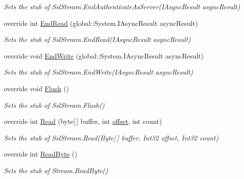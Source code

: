 \begin{DoxyCompactItemize}
\begin{DoxyCompactList}\small\item\em Sets the stub of Ssl\-Stream.\-End\-Authenticate\-As\-Server(\-I\-Async\-Result async\-Result)\end{DoxyCompactList}\item 
override int \hyperlink{class_system_1_1_net_1_1_security_1_1_fakes_1_1_stub_ssl_stream_a9f83d5a46f6e45edff9314a470deec02}{End\-Read} (global\-::\-System.\-I\-Async\-Result async\-Result)
\begin{DoxyCompactList}\small\item\em Sets the stub of Ssl\-Stream.\-End\-Read(\-I\-Async\-Result async\-Result)\end{DoxyCompactList}\item 
override void \hyperlink{class_system_1_1_net_1_1_security_1_1_fakes_1_1_stub_ssl_stream_adfb11a766ace6ed754e8dca373d4768d}{End\-Write} (global\-::\-System.\-I\-Async\-Result async\-Result)
\begin{DoxyCompactList}\small\item\em Sets the stub of Ssl\-Stream.\-End\-Write(\-I\-Async\-Result async\-Result)\end{DoxyCompactList}\item 
override void \hyperlink{class_system_1_1_net_1_1_security_1_1_fakes_1_1_stub_ssl_stream_aebbe398080aa5af7e91b6cb3e2875234}{Flush} ()
\begin{DoxyCompactList}\small\item\em Sets the stub of Ssl\-Stream.\-Flush()\end{DoxyCompactList}\item 
override int \hyperlink{class_system_1_1_net_1_1_security_1_1_fakes_1_1_stub_ssl_stream_acb2d2977c07955e3d76ff6200fb79311}{Read} (byte\mbox{[}$\,$\mbox{]} buffer, int \hyperlink{jquery-1_810_82_8js_a4a9f594d20d927164551fc7fa4751a2f}{offset}, int count)
\begin{DoxyCompactList}\small\item\em Sets the stub of Ssl\-Stream.\-Read(\-Byte\mbox{[}$\,$\mbox{]} buffer, Int32 offset, Int32 count)\end{DoxyCompactList}\item 
override int \hyperlink{class_system_1_1_net_1_1_security_1_1_fakes_1_1_stub_ssl_stream_aa00dd2e775cf7d216699ee7071f0bd99}{Read\-Byte} ()
\begin{DoxyCompactList}\small\item\em Sets the stub of Stream.\-Read\-Byte()\end{DoxyCompactList}\item 

\end{DoxyCompactItemize}
